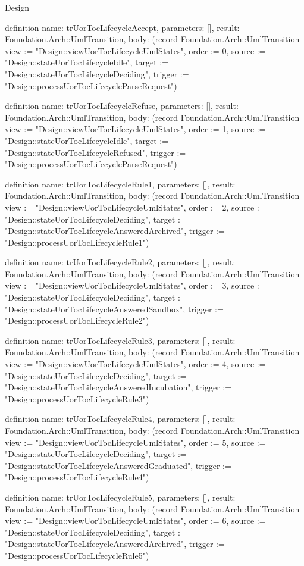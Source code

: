 \begin{lexlean}{Design}
\begin{semanticmodule}
definition{
  name: trUorTocLifecycleAccept,
  parameters: [],
  result: Foundation.Arch::UmlTransition,
  body: (record Foundation.Arch::UmlTransition {view := "Design::viewUorTocLifecycleUmlStates", order := 0, source := "Design::stateUorTocLifecycleIdle", target := "Design::stateUorTocLifecycleDeciding", trigger := "Design::processUorTocLifecycleParseRequest"})
}

definition{
  name: trUorTocLifecycleRefuse,
  parameters: [],
  result: Foundation.Arch::UmlTransition,
  body: (record Foundation.Arch::UmlTransition {view := "Design::viewUorTocLifecycleUmlStates", order := 1, source := "Design::stateUorTocLifecycleIdle", target := "Design::stateUorTocLifecycleRefused", trigger := "Design::processUorTocLifecycleParseRequest"})
}

definition{
  name: trUorTocLifecycleRule1,
  parameters: [],
  result: Foundation.Arch::UmlTransition,
  body: (record Foundation.Arch::UmlTransition {view := "Design::viewUorTocLifecycleUmlStates", order := 2, source := "Design::stateUorTocLifecycleDeciding", target := "Design::stateUorTocLifecycleAnsweredArchived", trigger := "Design::processUorTocLifecycleRule1"})
}

definition{
  name: trUorTocLifecycleRule2,
  parameters: [],
  result: Foundation.Arch::UmlTransition,
  body: (record Foundation.Arch::UmlTransition {view := "Design::viewUorTocLifecycleUmlStates", order := 3, source := "Design::stateUorTocLifecycleDeciding", target := "Design::stateUorTocLifecycleAnsweredSandbox", trigger := "Design::processUorTocLifecycleRule2"})
}

definition{
  name: trUorTocLifecycleRule3,
  parameters: [],
  result: Foundation.Arch::UmlTransition,
  body: (record Foundation.Arch::UmlTransition {view := "Design::viewUorTocLifecycleUmlStates", order := 4, source := "Design::stateUorTocLifecycleDeciding", target := "Design::stateUorTocLifecycleAnsweredIncubation", trigger := "Design::processUorTocLifecycleRule3"})
}

definition{
  name: trUorTocLifecycleRule4,
  parameters: [],
  result: Foundation.Arch::UmlTransition,
  body: (record Foundation.Arch::UmlTransition {view := "Design::viewUorTocLifecycleUmlStates", order := 5, source := "Design::stateUorTocLifecycleDeciding", target := "Design::stateUorTocLifecycleAnsweredGraduated", trigger := "Design::processUorTocLifecycleRule4"})
}

definition{
  name: trUorTocLifecycleRule5,
  parameters: [],
  result: Foundation.Arch::UmlTransition,
  body: (record Foundation.Arch::UmlTransition {view := "Design::viewUorTocLifecycleUmlStates", order := 6, source := "Design::stateUorTocLifecycleDeciding", target := "Design::stateUorTocLifecycleAnsweredArchived", trigger := "Design::processUorTocLifecycleRule5"})
}


\end{semanticmodule}
\end{lexlean}

